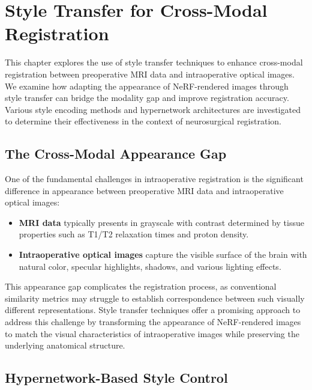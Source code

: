 
\chapter{Style Transfer for Cross-Modal Registration}\label{chapter:style_transfer}

This chapter explores the use of style transfer techniques to enhance cross-modal registration between preoperative MRI data and intraoperative optical images. We examine how adapting the appearance of NeRF-rendered images through style transfer can bridge the modality gap and improve registration accuracy. Various style encoding methods and hypernetwork architectures are investigated to determine their effectiveness in the context of neurosurgical registration.

\section{The Cross-Modal Appearance Gap}

One of the fundamental challenges in intraoperative registration is the significant difference in appearance between preoperative MRI data and intraoperative optical images:

\begin{itemize}
    \item \textbf{MRI data} typically presents in grayscale with contrast determined by tissue properties such as T1/T2 relaxation times and proton density.
    
    \item \textbf{Intraoperative optical images} capture the visible surface of the brain with natural color, specular highlights, shadows, and various lighting effects.
\end{itemize}

This appearance gap complicates the registration process, as conventional similarity metrics may struggle to establish correspondence between such visually different representations. Style transfer techniques offer a promising approach to address this challenge by transforming the appearance of NeRF-rendered images to match the visual characteristics of intraoperative images while preserving the underlying anatomical structure.

\section{Hypernetwork-Based Style Control}

